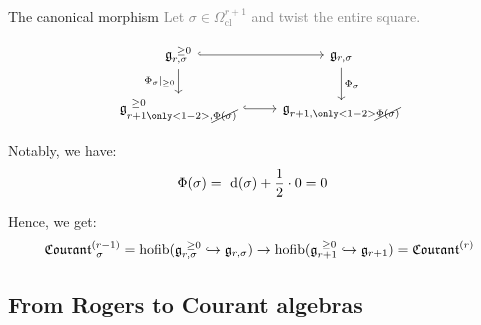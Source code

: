 \documentclass[beamer,10pt]{standalone}
\begin{document}
\begin{frame}{The canonical morphism}
  \textcolor{gray}{Let $\sigma \in \Omega^{r+1}_{\mathrm{cl}}$ and twist the entire square.}
  \vfill

	\begin{displaymath}
		\begin{tikzcd}[ampersand replacement=\&]
			\g_{r,\sigma}^{~\geq 0} \ar[r,hook] \ar[d, "\Phi_\sigma \vert_{\geq 0}"']
			\& \g_{r,\sigma} \ar[d, "\Phi_\sigma"]
			\\
			\g_{r+1\only<1-2>{,\cancel{\Phi(\sigma)}}}^{~\geq 0} \ar[r,hook] \& \g_{r+1,\only<1-2>{\cancel{\Phi(\sigma)}}}
		\end{tikzcd}
	\end{displaymath}
	\vfill

	Notably, we have:
	\begin{align*}
		\Phi(\sigma) &=~  \d(\sigma) + \frac{1}{2}\cdot 0 = 0
	\end{align*}
	\vfill \pause

	Hence, we get:
	$$ \Courant[\sigma]{r-1} = \hofib(\g_{r,\sigma}^{~\geq 0} \hookrightarrow \g_{r,\sigma}) \to \hofib(\g_{r+1}^{~\geq 0} \hookrightarrow \g_{r+1}) = \Courant{r}$$

		\begin{flushright}
			\qedsymbol
		\end{flushright}

\end{frame}

\subsection{From Rogers to Courant algebras}
\end{document}
